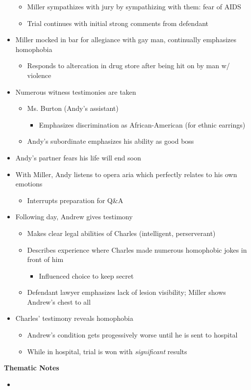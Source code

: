 \documentclass{article}
\begin{document}
\begin{itemize}
\begin{itemize}
            \item Miller sympathizes with jury by sympathizing with them: fear of AIDS 
            \item Trial continues with initial strong comments from defendant 
        \end{itemize}
        \item Miller mocked in bar for allegiance with gay man, continually emphasizes homophobia  
        \begin{itemize}
            \item Responds to altercation in drug store after being hit on by man w/ violence
        \end{itemize}
        \item Numerous witness testimonies are taken
        \begin{itemize}
            \item Ms. Burton (Andy's assistant)
            \begin{itemize}
                \item Emphasizes discrimination as African-American (for ethnic earrings)
            \end{itemize}
            \item Andy's subordinate emphasizes his ability as good boss
        \end{itemize}
        \item Andy's partner fears his life will end soon 
        \item With Miller, Andy listens to opera aria which perfectly relates to his own emotions
        \begin{itemize}
            \item Interrupts preparation for Q\&A
        \end{itemize}
        \item Following day, Andrew gives testimony 
        \begin{itemize}
            \item Makes clear legal abilities of Charles (intelligent, perserverant)
            \item Describes experience where Charles made numerous homophobic jokes in front of him 
            \begin{itemize}
                \item Influenced choice to keep secret 
            \end{itemize}
            \item Defendant lawyer emphasizes lack of lesion visibility; Miller shows Andrew's chest to all 
        \end{itemize}
        \item Charles' testimony reveals homophobia
        \begin{itemize}
            \item Andrew's condition gets progessively worse until he is sent to hospital 
            \item While in hospital, trial is won with \textit{significant} results
        \end{itemize}
    \end{itemize}
    
    \textbf{Thematic Notes}
    \begin{itemize}
        \item 
    \end{itemize}

    
\end{document}
